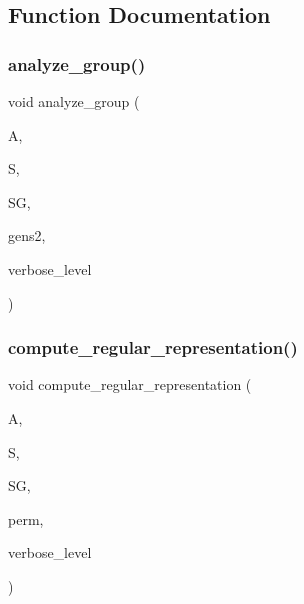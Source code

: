 \subsection{Function Documentation}
\mbox{\label{analyze__group_8_c_acc445ef9d19e7fe78fbe1a057328958e}} 
\subsubsection{\texorpdfstring{analyze\+\_\+group()}{analyze\_group()}}
{\footnotesize\ttfamily void analyze\+\_\+group (\begin{DoxyParamCaption}\item[{\mbox{\hyperlink{classaction}{action}} $\ast$}]{A,  }\item[{\mbox{\hyperlink{classsims}{sims}} $\ast$}]{S,  }\item[{\mbox{\hyperlink{classvector__ge}{vector\+\_\+ge}} $\ast$}]{SG,  }\item[{\mbox{\hyperlink{classvector__ge}{vector\+\_\+ge}} $\ast$}]{gens2,  }\item[{\mbox{\hyperlink{galois_8h_a09fddde158a3a20bd2dcadb609de11dc}{I\+NT}}}]{verbose\+\_\+level }\end{DoxyParamCaption})}

\mbox{\label{analyze__group_8_c_ad48d02425a513bdf27e6a9b29e427af2}} 
\subsubsection{\texorpdfstring{compute\+\_\+regular\+\_\+representation()}{compute\_regular\_representation()}}
{\footnotesize\ttfamily void compute\+\_\+regular\+\_\+representation (\begin{DoxyParamCaption}\item[{\mbox{\hyperlink{classaction}{action}} $\ast$}]{A,  }\item[{\mbox{\hyperlink{classsims}{sims}} $\ast$}]{S,  }\item[{\mbox{\hyperlink{classvector__ge}{vector\+\_\+ge}} $\ast$}]{SG,  }\item[{\mbox{\hyperlink{galois_8h_a09fddde158a3a20bd2dcadb609de11dc}{I\+NT}} $\ast$\&}]{perm,  }\item[{\mbox{\hyperlink{galois_8h_a09fddde158a3a20bd2dcadb609de11dc}{I\+NT}}}]{verbose\+\_\+level }\end{DoxyParamCaption})}


